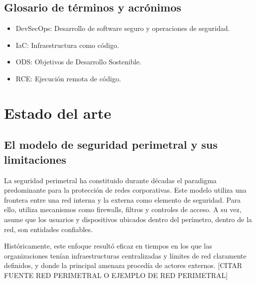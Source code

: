 \documentclass[11pt,spanish,listoffigures,listoftables]{tfgetsinf}
\begin{document}
    \section{Glosario de términos y acrónimos}
    \begin{itemize}
        \item DevSecOps: Desarrollo de software seguro y operaciones de seguridad.
        \item IaC: Infraestructura como código.
        \item ODS: Objetivos de Desarrollo Sostenible.
        \item RCE: Ejecución remota de código.
    \end{itemize}





\chapter{Estado del arte}
    \section{El modelo de seguridad perimetral y sus limitaciones}
    \label{sec:2.1}
    La seguridad perimetral ha constituido durante décadas el paradigma predominante para la protección de redes corporativas. Este modelo utiliza una frontera entre una red interna y la externa como elemento de seguridad. Para ello, utiliza mecanismos como firewalls, filtros y controles de acceso. A su vez, asume que los usuarios y dispositivos ubicados dentro del perímetro, dentro de la red, son entidades confiables. 
    
    Históricamente, este enfoque resultó eficaz en tiempos en los que las organizaciones tenían infraestructuras centralizadas y límites de red claramente definidos, y donde la principal amenaza procedía de actores externos. [CITAR FUENTE RED PERIMETRAL O EJEMPLO DE RED PERIMETRAL]
    
\end{document}
